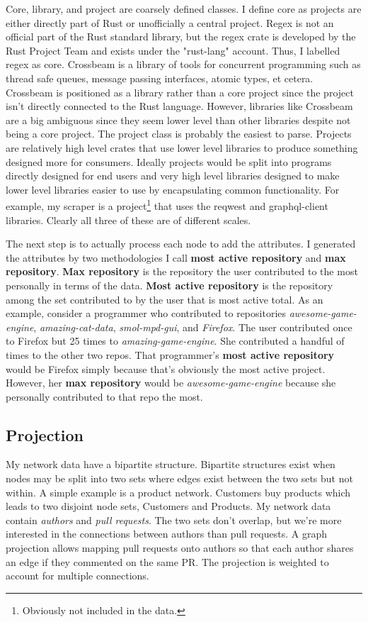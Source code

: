 \documentclass[12pt, a4paper]{article}
\begin{document}
Core, library, and project are coarsely defined classes. I define core as projects are either directly part of Rust or unofficially a central project. Regex is not an official part of the Rust standard library, but the regex crate is developed by the Rust Project Team and exists under the "rust-lang" account. Thus, I labelled regex as core. Crossbeam is a library of tools for concurrent programming such as thread safe queues, message passing interfaces, atomic types, et cetera. Crossbeam is positioned as a library rather than a core project since the project isn't directly connected to the Rust language. However, libraries like Crossbeam are a big ambiguous since they seem lower level than other libraries despite not being a core project. The project class is probably the easiest to parse. Projects are relatively high level crates that use lower level libraries to produce something designed more for consumers. Ideally projects would be split into programs directly designed for end users and very high level libraries designed to make lower level libraries easier to use by encapsulating common functionality. For example, my scraper is a project\footnote{Obviously not included in the data.} that uses the reqwest and graphql-client libraries. Clearly all three of these are of different scales.

The next step is to actually process each node to add the attributes. I generated the attributes by two methodologies I call \textbf{most active repository} and \textbf{max repository}. \textbf{Max repository} is the repository the user contributed to the most personally in terms of the data. \textbf{Most active repository} is the repository among the set contributed to by the user that is most active total. As an example, consider a programmer who contributed to repositories \textit{awesome-game-engine}, \textit{amazing-cat-data}, \textit{smol-mpd-gui}, and \textit{Firefox}. The user contributed once to Firefox but 25 times to \textit{amazing-game-engine}. She contributed a handful of times to the other two repos. That programmer's \textbf{most active repository} would be Firefox simply because that's obviously the most active project. However, her \textbf{max repository} would be \textit{awesome-game-engine} because she personally contributed to that repo the most.

\subsection{Projection}
My network data have a bipartite structure. Bipartite structures exist when nodes may be split into two sets where edges exist between the two sets but not within. A simple example is a product network. Customers buy products which leads to two disjoint node sets, Customers and Products. My network data contain \textit{authors} and \textit{pull requests}. The two sets don't overlap, but we're more interested in the connections between authors than pull requests. A graph projection allows mapping pull requests onto authors so that each author shares an edge if they commented on the same PR. The projection is weighted to account for multiple connections.
\end{document}
